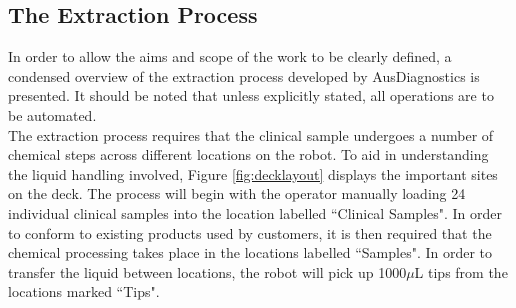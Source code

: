 \subsection{The Extraction Process}
\label{subsec:intro_extraction}

In order to allow the aims and scope of the work to be clearly defined, a condensed overview of the extraction process developed by AusDiagnostics is presented. It should be noted that unless explicitly stated, all operations are to be automated.\\

The extraction process requires that the clinical sample undergoes a number of chemical steps across different locations on the robot. To aid in understanding the liquid handling involved, Figure \ref{fig:decklayout} displays the important sites on the deck. The process will begin with the operator manually loading 24 individual clinical samples into the location labelled ``Clinical Samples". In order to conform to existing products used by customers, it is then required that the chemical processing takes place in the locations labelled ``Samples". In order to transfer the liquid between locations, the robot will pick up 1000$\mu$L tips from the locations marked ``Tips".\\

